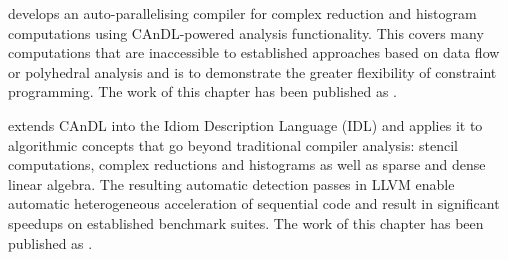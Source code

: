     {\bf{}} develops an auto-parallelising compiler for
    complex reduction and histogram computations using CAnDL-powered analysis
    functionality.
    This covers many computations that are inaccessible to established
    approaches based on data flow or polyhedral analysis and is to demonstrate
    the greater flexibility of constraint programming.
    The work of this chapter has been published as
    {\bf\citet{ginsbach2017discovery}}.

    {\bf{}} extends CAnDL into the Idiom Description Language
    (IDL) and applies it to algorithmic concepts that go beyond traditional
    compiler analysis: stencil computations, complex reductions and histograms
    as well as sparse and dense linear algebra.
    The resulting automatic detection passes in LLVM enable automatic
    heterogeneous acceleration of sequential code and result in significant
    speedups on established benchmark suites.
    The work of this chapter has been published as
    {\bf\citet{Ginsbach:2018:AML:3173162.3173182}}.
